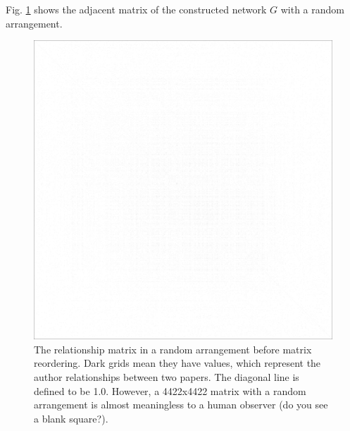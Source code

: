 Fig. \ref{fig:matrix_random_arrangement} shows the adjacent matrix of the constructed network $G$ with a random arrangement.

\begin{figure}
    \centering
    \includegraphics[width=\textwidth]{images/random_arrangement.png}
    \caption{The relationship matrix in a random arrangement before matrix reordering. 
    Dark grids mean they have values, which represent the author relationships between two papers.
    The diagonal line is defined to be 1.0.
    However, a 4422x4422 matrix with a random arrangement is almost meaningless to a human observer (do you see a blank square?).
    }
    \label{fig:matrix_random_arrangement}
\end{figure}
